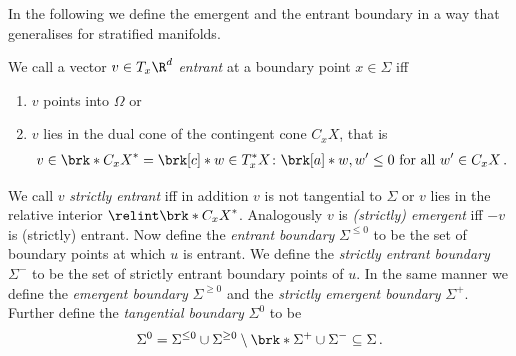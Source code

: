 In the following we define the emergent and the entrant boundary in a way that generalises
\cite[p.282]{Morse1970} for stratified manifolds.
\begin{definition}\label{df:emergentEntrantBd}
  We call a vector $v\in T_x\R^d$ \emph{entrant} at a boundary point $x\in\Sigma$ iff
  \begin{enumerate}
    \item $v$ points into $\Omega$ or
    \item $v$ lies in the dual cone of the contingent cone $C_xX$, that is
    \begin{align*}
      v\in \brk*{C_xX}^*=\brk[c]*{w\in T_x^*X\colon \brk[a]*{w, w'}\leq0\text{ for all }w'\in C_xX}\,.
    \end{align*}
  \end{enumerate}
  We call $v$ \emph{strictly entrant} iff in addition $v$ is not tangential to $\Sigma$ or $v$ lies in the relative interior $\relint\brk*{C_xX}^*$. 
  Analogously $v$ is \emph{(strictly) emergent} iff $-v$ is (strictly) entrant.
  Now define the \emph{entrant boundary} $\Sigma^{\leq0}$ to be the set of boundary points at which $u$ is entrant.
  We define the \emph{strictly entrant boundary} $\Sigma^-$ to be the set of strictly entrant boundary points of $u$.
  In the same manner we define the \emph{emergent boundary} $\Sigma^{\geq0}$ and the \emph{strictly emergent boundary} $\Sigma^+$.
  Further define the \emph{tangential boundary} $\Sigma^0$ to be
  \begin{align}
    \Sigma^0=\Sigma^{\leq0}\cup\Sigma^{\geq0}\setminus\brk*{\Sigma^+\cup\Sigma^-}\subseteq\Sigma\,.
  \end{align}
\end{definition}



